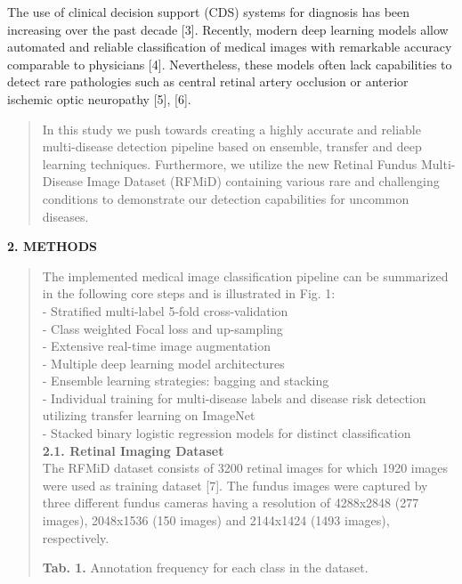 \documentclass[
]{article}
\begin{document}
The use of clinical decision support (CDS) systems for diagnosis has
been increasing over the past decade {[}3{]}. Recently, modern deep
learning models allow automated and reliable classification of medical
images with remarkable accuracy comparable to physicians {[}4{]}.
Nevertheless, these models often lack capabilities to detect rare
pathologies such as central retinal artery occlusion or anterior
ischemic optic neuropathy {[}5{]}, {[}6{]}.

\begin{quote}
In this study we push towards creating a highly accurate and reliable
multi-disease detection pipeline based on ensemble, transfer and deep
learning techniques. Furthermore, we utilize the new Retinal Fundus
Multi-Disease Image Dataset (RFMiD) containing various rare and
challenging conditions to demonstrate our detection capabilities for
uncommon diseases.
\end{quote}

\textbf{2. METHODS}

\begin{quote}
The implemented medical image classification pipeline can be summarized
in the following core steps and is illustrated in Fig. 1:\\
- Stratified multi-label 5-fold cross-validation\\
- Class weighted Focal loss and up-sampling\\
- Extensive real-time image augmentation\\
- Multiple deep learning model architectures\\
- Ensemble learning strategies: bagging and stacking\\
- Individual training for multi-disease labels and disease risk
detection utilizing transfer learning on ImageNet\\
- Stacked binary logistic regression models for distinct
classification\\
\textbf{2.1. Retinal Imaging Dataset}\\
The RFMiD dataset consists of 3200 retinal images for which 1920 images
were used as training dataset {[}7{]}. The fundus images were captured
by three different fundus cameras having a resolution of 4288x2848 (277
images), 2048x1536 (150 images) and 2144x1424 (1493 images),
respectively.

\textbf{Tab. 1.} Annotation frequency for each class in the dataset.
\end{quote}
\end{document}
